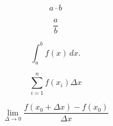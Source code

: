 



%


\begin{equation*}
	a\cdot b
\end{equation*}

\begin{equation*}
	\frac{a}{b}
\end{equation*}

\begin{equation*}
	\int_a^b f(x)\, dx. 
\end{equation*}

\begin{equation*}
	\sum_{i=1}^n f(x_i) \Delta x
\end{equation*}

\begin{equation*}
	\lim_{\Delta \to 0} \frac{f(x_0+\Delta x)-f(x_0)}{\Delta x}
\end{equation*}

